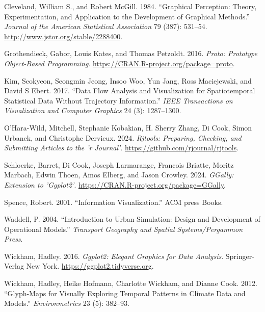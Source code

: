 \hypertarget{refs}{}
\begin{CSLReferences}{1}{0}
\leavevmode{}%
Cleveland, William S., and Robert McGill. 1984. {``Graphical Perception: Theory, Experimentation, and Application to the Development of Graphical Methods.''} \emph{Journal of the American Statistical Association} 79 (387): 531--54. \url{http://www.jstor.org/stable/2288400}.

\leavevmode{}%
Grothendieck, Gabor, Louis Kates, and Thomas Petzoldt. 2016. \emph{Proto: Prototype Object-Based Programming}. \url{https://CRAN.R-project.org/package=proto}.

\leavevmode{}%
Kim, Seokyeon, Seongmin Jeong, Insoo Woo, Yun Jang, Ross Maciejewski, and David S Ebert. 2017. {``Data Flow Analysis and Visualization for Spatiotemporal Statistical Data Without Trajectory Information.''} \emph{IEEE Transactions on Visualization and Computer Graphics} 24 (3): 1287--1300.

\leavevmode{}%
O'Hara-Wild, Mitchell, Stephanie Kobakian, H. Sherry Zhang, Di Cook, Simon Urbanek, and Christophe Dervieux. 2024. \emph{Rjtools: Preparing, Checking, and Submitting Articles to the 'r Journal'}. \url{https://github.com/rjournal/rjtools}.

\leavevmode{}%
Schloerke, Barret, Di Cook, Joseph Larmarange, Francois Briatte, Moritz Marbach, Edwin Thoen, Amos Elberg, and Jason Crowley. 2024. \emph{GGally: Extension to 'Ggplot2'}. \url{https://CRAN.R-project.org/package=GGally}.

\leavevmode{}%
Spence, Robert. 2001. {``Information Visualization.''} ACM press Books.

\leavevmode{}%
Waddell, P. 2004. {``Introduction to Urban Simulation: Design and Development of Operational Models.''} \emph{Transport Geography and Spatial Systems/Pergammon Press}.

\leavevmode{}%
Wickham, Hadley. 2016. \emph{Ggplot2: Elegant Graphics for Data Analysis}. Springer-Verlag New York. \url{https://ggplot2.tidyverse.org}.

\leavevmode{}%
Wickham, Hadley, Heike Hofmann, Charlotte Wickham, and Dianne Cook. 2012. {``Glyph-Maps for Visually Exploring Temporal Patterns in Climate Data and Models.''} \emph{Environmetrics} 23 (5): 382--93.


\end{CSLReferences}

